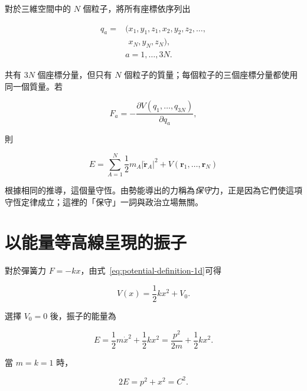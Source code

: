 對於三維空間中的 \(N\) 個粒子，將所有座標依序列出

\begin{equation}
  \begin{aligned}
    q_a={}&(x_1,y_1,z_1,x_2,y_2,z_2,\ldots,\\[-0.2em]
           &\phantom{(}x_N,y_N,z_N),\\
    &a=1,\ldots,3N.
  \end{aligned}
  \label{eq:flattened-coordinates}
\end{equation}

共有 \(3N\) 個座標分量，但只有 \(N\) 個粒子的質量；每個粒子的三個座標分量都使用同一個質量。若

\begin{equation}
  F_a=-\frac{\partial V(q_1,\ldots,q_{3N})}{\partial q_a},
  \label{eq:many-particle-conservative-force}
\end{equation}

則

\begin{equation}
  E=\sum_{A=1}^{N}\frac12m_A\lvert\dot{\mathbf r}_A\rvert^2
    +V(\mathbf r_1,\ldots,\mathbf r_N)
  \label{eq:many-particle-energy}
\end{equation}

根據相同的推導，這個量守恆。由勢能導出的力稱為\emph{保守}力，正是因為它們使這項守恆定律成立；這裡的「保守」一詞與政治立場無關。

\section{以能量等高線呈現的振子}
\enlargethispage{3\baselineskip}

對於彈簧力 \(F=-kx\)，由式~\eqref{eq:potential-definition-1d}可得

\begin{equation}
  V(x)=\frac12kx^2+V_0.
  \label{eq:spring-potential}
\end{equation}

選擇 \(V_0=0\) 後，振子的能量為

\begin{equation}
  E=\frac12m\dot x^2+\frac12kx^2
   =\frac{p^2}{2m}+\frac12kx^2.
  \label{eq:oscillator-energy}
\end{equation}

當 \(m=k=1\) 時，

\begin{equation}
  2E=p^2+x^2=C^2.
  \label{eq:oscillator-energy-circle}
\end{equation}

